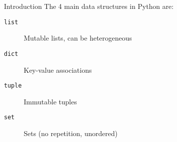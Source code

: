 \begin{frame}{Introduction}
  The 4 main data structures in Python are:

  \begin{description}
    \item[\texttt{list}] Mutable lists, can be heterogeneous
    \item[\texttt{dict}] Key-value associations
    \item[\texttt{tuple}] Immutable tuples
    \item[\texttt{set}] Sets (no repetition, unordered)
  \end{description}
\end{frame}
